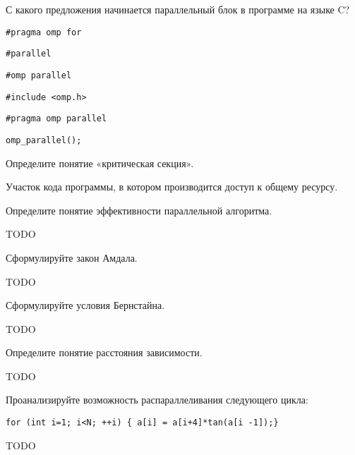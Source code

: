 \documentclass[a4paper, 12pt, addpoints]{exam}
\newcommand{\todo}{{\color{red}TODO}\ }
\begin{document}
\begin{questions}
\question[1] С какого предложения начинается параллельный блок в программе на языке C?
\begin{choices}
    \choice \begin{verbatim}#pragma omp for\end{verbatim}
    \choice \begin{verbatim}#parallel\end{verbatim}
    \choice \begin{verbatim}#omp parallel\end{verbatim}
    \choice \begin{verbatim}#include <omp.h>\end{verbatim}
    \correctchoice \begin{verbatim}#pragma omp parallel\end{verbatim}
    \choice \begin{verbatim}omp_parallel();\end{verbatim}
\end{choices}



\question[3] Определите понятие «критическая секция».
\begin{solution}[2cm]
Участок кода программы, в котором производится доступ к общему ресурсу.
\end{solution}

\question[3] Определите понятие эффективности параллельной алгоритма.
\begin{solution}[2cm]
\todo
\end{solution}

\question[3] Сформулируйте закон Амдала.
\begin{solution}[2cm]
\todo
\end{solution}

\question[3] Сформулируйте условия Бернстайна.
\begin{solution}[2cm]
\todo
\end{solution}

\question[3] Определите понятие расстояния зависимости.
\begin{solution}[2cm]
\todo
\end{solution}

\question[3] Проанализируйте возможность распараллеливания следующего цикла:
\begin{lstlisting}
for (int i=1; i<N; ++i) { a[i] = a[i+4]*tan(a[i -1]);}
\end{lstlisting}
\begin{solution}[2cm]
\todo
\end{solution}


\end{questions}
\end{document}
